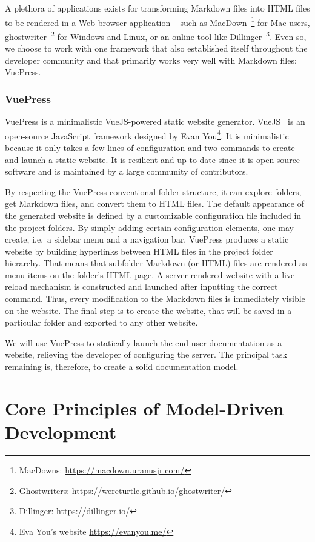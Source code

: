 A plethora of applications exists for transforming Markdown files into HTML files to be rendered in a Web browser application -- such as MacDown~\footnote[1]{MacDowns: \url{https://macdown.uranusjr.com/}} for Mac users, ghostwriter~\footnote[2]{Ghostwriters: \url{https://wereturtle.github.io/ghostwriter/}} for Windows and Linux, or an online tool like Dillinger~\footnote[3]{Dillinger: \url{https://dillinger.io/}}. Even so, we choose to work with one framework that also established itself throughout the developer community and that primarily works very well with Markdown files: VuePress.

\subsubsection{VuePress}\label{sec:VP}

VuePress is a minimalistic VueJS-powered static website generator. VueJS~\cite{vuepress} is an open-source JavaScript framework designed by Evan You\footnote[4]{Eva You's website \url{https://evanyou.me/}}. It is minimalistic because it only takes a few lines of configuration and two commands to create and launch a static website. It is resilient and up-to-date since it is open-source software and is maintained by a large community of contributors.

By respecting the VuePress conventional folder structure, it can explore folders, get Markdown files, and convert them to HTML files. The default appearance of the generated website is defined by a customizable configuration file included in the project folders. By simply adding certain configuration elements, one may create, i.e.~a sidebar menu and a navigation bar. VuePress produces a static website by building hyperlinks between HTML files in the project folder hierarchy. That means that subfolder Markdown (or HTML) files are rendered as menu items on the folder's HTML page. A server-rendered website with a live reload mechanism is constructed and launched after inputting the correct command. Thus, every modification to the Markdown files is immediately visible on the website. The final step is to create the website, that will be saved in a particular folder and exported to any other website.

We will use VuePress to statically launch the end user documentation as a website, relieving the developer of configuring the server. The principal task remaining is, therefore, to create a solid documentation model.

\section{Core Principles of Model-Driven Development}



